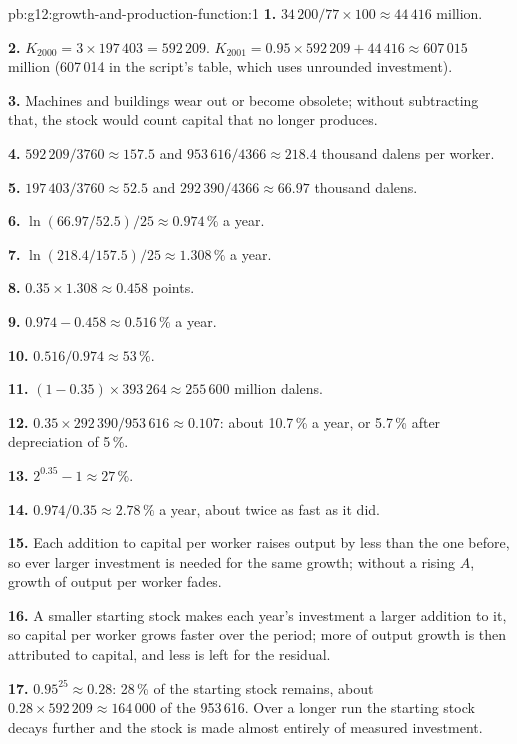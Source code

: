 \begin{solution}{pb:g12:growth-and-production-function:1}
\textbf{1.} $34\,200/77 \times 100 \approx 44\,416$ million.

\textbf{2.} $K_{2000} = 3 \times 197\,403 = 592\,209$. $K_{2001} = 0.95 \times 592\,209 + 44\,416 \approx 607\,015$ million (607\,014 in the script's table, which uses
unrounded investment).

\textbf{3.} Machines and buildings wear out or become obsolete; without subtracting that, the stock would count capital that no longer produces.

\textbf{4.} $592\,209/3760 \approx 157.5$ and $953\,616/4366 \approx 218.4$ thousand dalens per worker.

\textbf{5.} $197\,403/3760 \approx 52.5$ and $292\,390/4366 \approx 66.97$ thousand dalens.

\textbf{6.} $\ln(66.97/52.5)/25 \approx 0.974\,\%$ a year.

\textbf{7.} $\ln(218.4/157.5)/25 \approx 1.308\,\%$ a year.

\textbf{8.} $0.35 \times 1.308 \approx 0.458$ points.

\textbf{9.} $0.974 - 0.458 \approx 0.516\,\%$ a year.

\textbf{10.} $0.516/0.974 \approx 53\,\%$.

\textbf{11.} $(1 - 0.35) \times 393\,264 \approx 255\,600$ million dalens.

\textbf{12.} $0.35 \times 292\,390/953\,616 \approx 0.107$: about 10.7\,\% a year, or 5.7\,\% after depreciation of 5\,\%.

\textbf{13.} $2^{0.35} - 1 \approx 27\,\%$.

\textbf{14.} $0.974/0.35 \approx 2.78\,\%$ a year, about twice as fast as it did.

\textbf{15.} Each addition to capital per worker raises output by less than the one before, so ever larger investment is needed for the same growth; without a rising $A$,
growth of output per worker fades.

\textbf{16.} A smaller starting stock makes each year's investment a larger addition to it, so capital per worker grows faster over the period; more of output growth is then
attributed to capital, and less is left for the residual.

\textbf{17.} $0.95^{25} \approx 0.28$: 28\,\% of the starting stock remains, about $0.28 \times 592\,209 \approx 164\,000$ of the 953\,616. Over a longer run the starting
stock decays further and the stock is made almost entirely of measured investment.


\end{solution}
